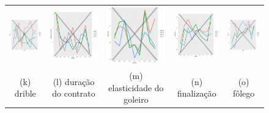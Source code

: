 \documentclass[doc,apacite,oneside,a4paper,12pt]{apa6}
\begin{document}
\begin{figure}
\begin{tabular}{ccccc}
 \includegraphics[width=25mm]{dribles_result_trans} & \includegraphics[width=25mm]{duracaodocontrato_result_trans} &   \includegraphics[width=25mm]{elast_gl_result_trans} &
  \includegraphics[width=25mm]{finalizacao_result_trans} & \includegraphics[width=25mm]{folego_result_trans}  \\
 \scriptsize{(k) drible} & \scriptsize{(l) duração do contrato } & \scriptsize{(m) elasticidade do goleiro} & \scriptsize{(n) finalização} & \scriptsize{(o) fôlego}\\[3pt]
 

\end{tabular}
\end{figure}
\end{document}
